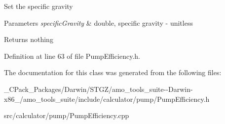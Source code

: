 Set the specific gravity


\begin{DoxyParams}{Parameters}
{\em specific\+Gravity} & double, specific gravity -\/ unitless\\
\hline
\end{DoxyParams}
\begin{DoxyReturn}{Returns}
nothing 
\end{DoxyReturn}


Definition at line 63 of file Pump\+Efficiency.\+h.



The documentation for this class was generated from the following files\+:\begin{DoxyCompactItemize}
\item 
\+\_\+\+C\+Pack\+\_\+\+Packages/\+Darwin/\+S\+T\+G\+Z/amo\+\_\+tools\+\_\+suite-\/-\/\+Darwin-\/x86\+\_/amo\+\_\+tools\+\_\+suite/include/calculator/pump/Pump\+Efficiency.\+h\item 
src/calculator/pump/Pump\+Efficiency.\+cpp\end{DoxyCompactItemize}
